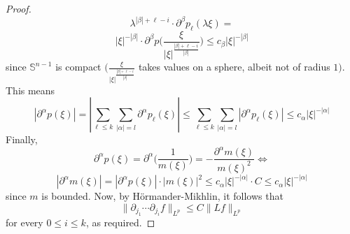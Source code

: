 \documentclass[12pt]{article}
\newenvironment{exercise}[2][Exercise]{\begin{trivlist}
\item[\hskip \labelsep {\bfseries #1}\hskip \labelsep {\bfseries #2.}]}{\end{trivlist}}
\begin{document}
\begin{proof}
$$    \lambda^{|\beta| + \ell -i} \cdot \partial^\beta p_\ell(\lambda \xi)  =
  $$
  $$
    |\xi|^{-|\beta|} \cdot \partial^\beta p \Bigg( \frac{\xi}{|\xi|^{\frac{|\beta| + \ell -i}{|\beta|}}} \Bigg) \le
    c_\beta |\xi|^{-|\beta|}
  $$
  since $\mathbb{S}^{n-1}$ is compact $\Big(\frac{\xi}{|\xi|^{\frac{|\beta| + \ell -i}{|\beta|}}}$ takes values on a sphere, albeit not of radius $1 \Big)$.\\
  This means
  $$
    |\partial^\alpha p(\xi)| =
    |\sum_{\ell \le k} \sum_{|\alpha| = l} \partial^\alpha p_\ell(\xi)| \le
    \sum_{\ell \le k} \sum_{|\alpha| = l} |\partial^\alpha p_\ell(\xi)| \le
    c_\alpha |\xi|^{-|\alpha|}
  $$
  Finally,
  $$
    \partial^\alpha p(\xi) =
    \partial^\alpha \Big( \frac{1}{m(\xi)} \Big) =
    -\dfrac{\partial^\alpha m(\xi)}{m(\xi)^2} \iff
  $$
  $$
    |\partial^\alpha m(\xi)| =
    |\partial^\alpha p(\xi)| \cdot |m(\xi)|^2 \le
    c_\alpha |\xi|^{-|\alpha|} \cdot C \le
    c_\alpha |\xi|^{-|\alpha|}
  $$
  since $m$ is bounded. Now, by Hörmander-Mikhlin, it follows that
  $$
    \|\partial_{j_1} \cdots \partial_{j_i} f\|_{L^p} \le
    C \|Lf\|_{L^p}
  $$
  for every $0 \le i \le k$, as required.
\end{proof}

\begin{exercise}{3}
\end{exercise}
\end{document}
